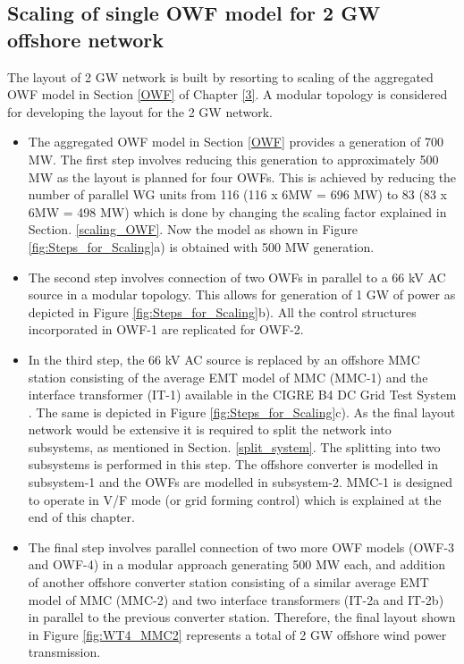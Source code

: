 \subsection{Scaling of single \gls{OWF} model for 2 GW offshore network}\label{scaling_2GW}

The layout of 2 GW network is built by resorting to scaling of the aggregated \gls{OWF} model in Section \ref{OWF} of Chapter \ref{3}. A modular topology is considered for developing the layout for the 2 GW network. 

\begin{itemize}
    \item The aggregated \gls{OWF} model in Section \ref{OWF} provides a generation of 700 MW. The first step involves reducing this generation to approximately 500 MW as the layout is planned for four \gls{OWF}s. This is achieved by reducing the number of parallel \gls{WG} units from 116 (116 x 6MW = 696 MW) to 83 (83 x 6MW = 498 MW) which is done by changing the scaling factor explained in Section. \ref{scaling_OWF}. Now the model as shown in Figure \ref{fig:Steps_for_Scaling}a) is obtained with 500 MW generation.
    \item The second step involves connection of two \gls{OWF}s in parallel to a 66 kV \gls{AC} source in a modular topology. This allows for generation of 1 GW of power as depicted in Figure \ref{fig:Steps_for_Scaling}b). All the control structures incorporated in \gls{OWF}-1 are replicated for \gls{OWF}-2.
    \item In the third step, the 66 kV \gls{AC} source is replaced by an offshore \gls{MMC} station consisting of the average \gls{EMT} model of \gls{MMC} (\gls{MMC}-1) and the interface transformer (IT-1) available in the CIGRE B4 DC Grid Test System \cite{vrana2013cigre}. The same is depicted in Figure \ref{fig:Steps_for_Scaling}c). As the final layout network would be extensive it is required to split the network into subsystems, as mentioned in Section. \ref{split_system}. The splitting into two subsystems is performed in this step. The offshore converter is modelled in subsystem-1 and the \gls{OWF}s are modelled in subsystem-2. \gls{MMC}-1 is designed to operate in V/F mode (or grid forming control) which is explained at the end of this chapter.
    \item The final step involves parallel connection of two more \gls{OWF} models (\gls{OWF}-3 and \gls{OWF}-4) in a modular approach generating 500 MW each, and addition of another offshore converter station consisting of a similar average \gls{EMT} model of \gls{MMC} (\gls{MMC}-2) and two interface transformers (IT-2a and IT-2b) in parallel to the previous converter station. Therefore, the final layout shown in Figure \ref{fig:WT4_MMC2} represents a total of 2 GW offshore wind power transmission.
\end{itemize}


